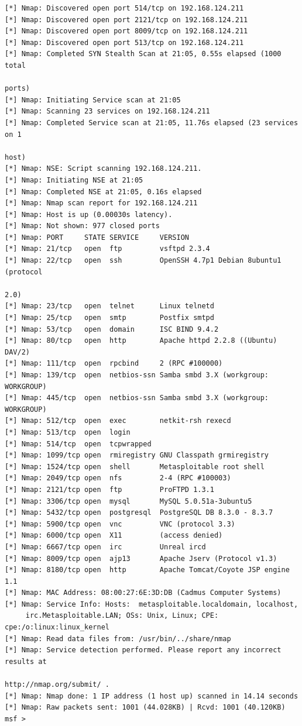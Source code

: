 \begin{Verbatim}[frame=single]
[*] Nmap: Discovered open port 514/tcp on 192.168.124.211
[*] Nmap: Discovered open port 2121/tcp on 192.168.124.211
[*] Nmap: Discovered open port 8009/tcp on 192.168.124.211
[*] Nmap: Discovered open port 513/tcp on 192.168.124.211
[*] Nmap: Completed SYN Stealth Scan at 21:05, 0.55s elapsed (1000 total
                                                                       ports)
[*] Nmap: Initiating Service scan at 21:05
[*] Nmap: Scanning 23 services on 192.168.124.211
[*] Nmap: Completed Service scan at 21:05, 11.76s elapsed (23 services on 1
                                                                        host)
[*] Nmap: NSE: Script scanning 192.168.124.211.
[*] Nmap: Initiating NSE at 21:05
[*] Nmap: Completed NSE at 21:05, 0.16s elapsed
[*] Nmap: Nmap scan report for 192.168.124.211
[*] Nmap: Host is up (0.00030s latency).
[*] Nmap: Not shown: 977 closed ports
[*] Nmap: PORT     STATE SERVICE     VERSION
[*] Nmap: 21/tcp   open  ftp         vsftpd 2.3.4
[*] Nmap: 22/tcp   open  ssh         OpenSSH 4.7p1 Debian 8ubuntu1 (protocol
                                                                         2.0)
[*] Nmap: 23/tcp   open  telnet      Linux telnetd
[*] Nmap: 25/tcp   open  smtp        Postfix smtpd
[*] Nmap: 53/tcp   open  domain      ISC BIND 9.4.2
[*] Nmap: 80/tcp   open  http        Apache httpd 2.2.8 ((Ubuntu) DAV/2)
[*] Nmap: 111/tcp  open  rpcbind     2 (RPC #100000)
[*] Nmap: 139/tcp  open  netbios-ssn Samba smbd 3.X (workgroup: WORKGROUP)
[*] Nmap: 445/tcp  open  netbios-ssn Samba smbd 3.X (workgroup: WORKGROUP)
[*] Nmap: 512/tcp  open  exec        netkit-rsh rexecd
[*] Nmap: 513/tcp  open  login
[*] Nmap: 514/tcp  open  tcpwrapped
[*] Nmap: 1099/tcp open  rmiregistry GNU Classpath grmiregistry
[*] Nmap: 1524/tcp open  shell       Metasploitable root shell
[*] Nmap: 2049/tcp open  nfs         2-4 (RPC #100003)
[*] Nmap: 2121/tcp open  ftp         ProFTPD 1.3.1
[*] Nmap: 3306/tcp open  mysql       MySQL 5.0.51a-3ubuntu5
[*] Nmap: 5432/tcp open  postgresql  PostgreSQL DB 8.3.0 - 8.3.7
[*] Nmap: 5900/tcp open  vnc         VNC (protocol 3.3)
[*] Nmap: 6000/tcp open  X11         (access denied)
[*] Nmap: 6667/tcp open  irc         Unreal ircd
[*] Nmap: 8009/tcp open  ajp13       Apache Jserv (Protocol v1.3)
[*] Nmap: 8180/tcp open  http        Apache Tomcat/Coyote JSP engine 1.1
[*] Nmap: MAC Address: 08:00:27:6E:3D:DB (Cadmus Computer Systems)
[*] Nmap: Service Info: Hosts:  metasploitable.localdomain, localhost, 
     irc.Metasploitable.LAN; OSs: Unix, Linux; CPE: cpe:/o:linux:linux_kernel
[*] Nmap: Read data files from: /usr/bin/../share/nmap
[*] Nmap: Service detection performed. Please report any incorrect results at
                                                    http://nmap.org/submit/ .
[*] Nmap: Nmap done: 1 IP address (1 host up) scanned in 14.14 seconds
[*] Nmap: Raw packets sent: 1001 (44.028KB) | Rcvd: 1001 (40.120KB)
msf > 
\end{Verbatim}

